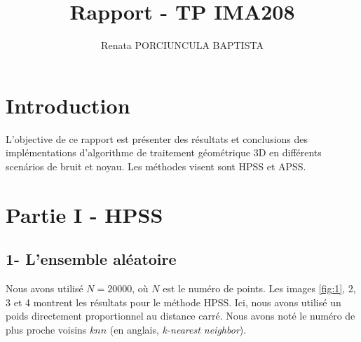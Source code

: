 \documentclass[a4,12pt]{report}
\title{ Rapport - TP IMA208}
\author{Renata PORCIUNCULA BAPTISTA}
\begin{document}
\maketitle
\section*{Introduction}
L'objective de ce rapport est présenter des résultats et conclusions des implémentations d'algorithme de traitement géométrique 3D en différents scenários de bruit et noyau. Les méthodes visent sont HPSS et APSS.

\section*{Partie I - HPSS}
\subsection*{1- L'ensemble aléatoire}
Nous avons utilisé $N=20000$, où $N$ est le numéro de points. Les images \ref{fig:1}, 2, 3 et 4 montrent les résultats pour le méthode HPSS. Ici, nous avons utilisé un poids directement proportionnel au distance carré. Nous avons noté le numéro de plus proche voisins $knn$ (en anglais, \textit{k-nearest neighbor}).
\end{document}
